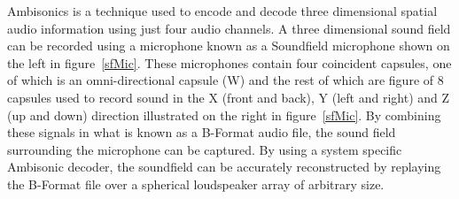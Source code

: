 \documentclass[../../main.tex]{subfiles}
\begin{document}
			Ambisonics is a technique used to encode and decode three dimensional spatial audio information using just four audio channels. A three dimensional sound field can be recorded using a microphone known as a Soundfield microphone shown on the left in figure~\ref{sfMic}. These microphones contain four coincident capsules, one of which is an omni-directional capsule (W) and the rest of which are figure of 8 capsules used to record sound in the X (front and back), Y (left and right) and Z (up and down) direction illustrated on the right in figure~\ref{sfMic}. By combining these signals in what is known as a B-Format audio file, the sound field surrounding the microphone can be captured. By using a system specific Ambisonic decoder, the soundfield can be accurately reconstructed by replaying the B-Format file over a spherical loudspeaker array of arbitrary size.
\end{document}
